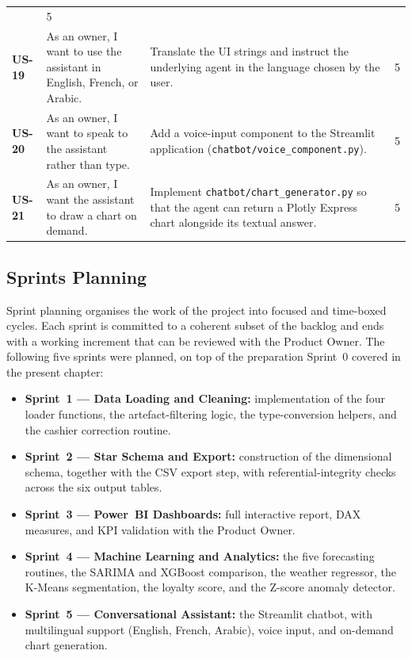 \documentclass[12pt, a4paper]{report}
\begin{document}
\begin{longtable}{>{\bfseries}p{1.3cm} p{4.6cm} p{6.6cm} c}
        & 5 \\[3pt]
  US-19 & As an owner, I want to use the assistant in English, French,
          or Arabic.
        & Translate the UI strings and instruct the underlying agent in
          the language chosen by the user.
        & 5 \\[3pt]
  US-20 & As an owner, I want to speak to the assistant rather than
          type.
        & Add a voice-input component to the Streamlit application
          (\texttt{chatbot/voice\_component.py}).
        & 5 \\[3pt]
  US-21 & As an owner, I want the assistant to draw a chart on demand.
        & Implement \texttt{chatbot/chart\_generator.py} so that the
          agent can return a Plotly Express chart alongside its textual
          answer.
        & 5 \\
\end{longtable}

\subsection{Sprints Planning}

Sprint planning organises the work of the project into focused and
time-boxed cycles. Each sprint is committed to a coherent subset of the
backlog and ends with a working increment that can be reviewed with the
Product Owner. The following five sprints were planned, on top of the
preparation Sprint~0 covered in the present chapter:

\begin{itemize}
  \item \textbf{Sprint~1 — Data Loading and Cleaning:} implementation of
        the four loader functions, the artefact-filtering logic, the
        type-conversion helpers, and the cashier correction routine.
  \item \textbf{Sprint~2 — Star Schema and Export:} construction of the
        dimensional schema, together with the CSV export step, with
        referential-integrity checks across the six output tables.
  \item \textbf{Sprint~3 — Power~BI Dashboards:} full interactive report,
        DAX measures, and KPI validation with the Product Owner.
  \item \textbf{Sprint~4 — Machine Learning and Analytics:} the five
        forecasting routines, the SARIMA and XGBoost comparison, the
        weather regressor, the K-Means segmentation, the loyalty score,
        and the Z-score anomaly detector.
  \item \textbf{Sprint~5 — Conversational Assistant:} the Streamlit
        chatbot, with multilingual support (English, French, Arabic),
        voice input, and on-demand chart generation.
\end{itemize}
\end{document}
